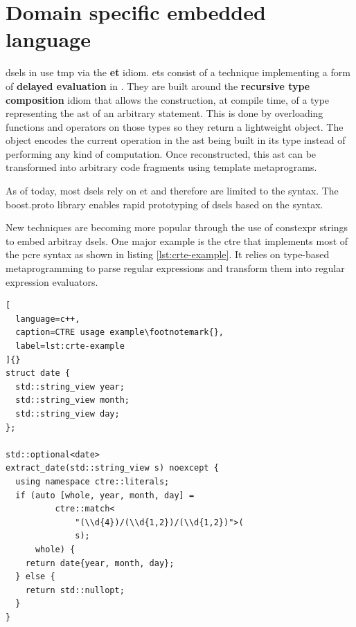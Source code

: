 \documentclass[../main]{subfiles}
\begin{document}
\section{
  Domain specific embedded language
}
\label{lbl:expression-level-metaprogramming}


\glspl{dsel} in \cpp use \gls{tmp} via the \textbf{\gls{et}} idiom.
\Glspl{et} \cite{veldhuizen:1995,vandevoorde:2002} consist of a
technique implementing a form of \textbf{delayed evaluation} in
\cpp \cite{spinellis:2001}. They are built around the
\textbf{recursive type composition} idiom \cite{jarvi:1998} that allows the
construction, at compile time, of a type representing the \gls{ast}
of an arbitrary statement.
This is done by overloading functions and operators on those types
so they return a lightweight object. The object encodes the current operation
in the \gls{ast} being built in its type instead of performing
any kind of computation. Once reconstructed, this \gls{ast} can be transformed
into arbitrary code fragments using template metaprograms.

As of today, most \cpp \glspl{dsel} rely on \gls{et} and therefore
are limited to the \cpp syntax. The boost.proto \cite{boost.proto} library
enables rapid prototyping of \glspl{dsel} based on the \cpp syntax.

New techniques are becoming more popular through
the use of \gls{constexpr} strings to embed arbitray
\glspl{dsel}. One major example is the \gls{ctre} \cite{ctre}
that implements most of the \gls{pcre} syntax as shown in
listing \ref{lst:crte-example}.
It relies on type-based metaprogramming to parse regular expressions and
transform them into regular expression evaluators.

\begin{lstlisting}[
  language=c++,
  caption=CTRE usage example\footnotemark{},
  label=lst:crte-example
]{}
struct date {
  std::string_view year;
  std::string_view month;
  std::string_view day;
};

std::optional<date>
extract_date(std::string_view s) noexcept {
  using namespace ctre::literals;
  if (auto [whole, year, month, day] =
          ctre::match<
              "(\\d{4})/(\\d{1,2})/(\\d{1,2})">(
              s);
      whole) {
    return date{year, month, day};
  } else {
    return std::nullopt;
  }
}
\end{lstlisting}
\end{document}
